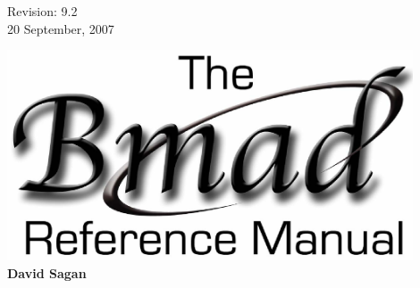 \thispagestyle{empty}

\begin{flushright}
\large
  Revision: 9.2 \\
  20 September, 2007 \\
\end{flushright}

\vfill

{
\begin{center}
\includegraphics[width=12cm]{bmad-ref-manual.eps} \\
\vskip 0.3in
\huge\bf David Sagan
\end{center}
}

\vfill
\break

